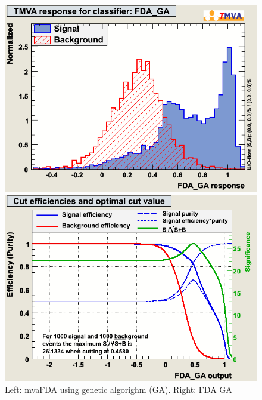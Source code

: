 \begin{figure}[h]
 \begin{minipage}{8.5cm}
\includegraphics[width=1.0\textwidth]{images/pkMva_FDA_GA.png}
\end{minipage}
 \hfill
\begin{minipage}{8.5cm}
\includegraphics[width=1.0\textwidth]{images/pkMvaEffs_FDA_GA.png}
\end{minipage}
\caption{Left: mvaFDA using genetic algorighm (GA). Right: FDA GA}
\label{fig:pkMvaFDAGA}
\end{figure}


